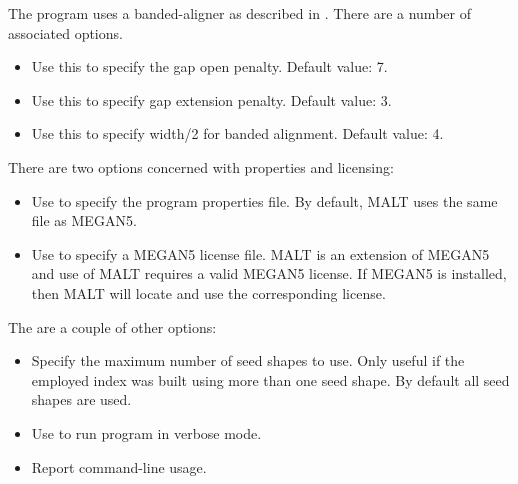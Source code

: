 \documentclass[11pt]{article}
\newcommand\MALT{{\sf MALT}\xspace}
\begin{document}
The program uses a banded-aligner as described in \cite{ChaoPM92}. There are a number of associated options.
\begin{itemize}
\setlength{\itemindent}{30pt}
\item[\itt{--gapOpen}]             Use this to specify the gap open penalty. Default value: 7.
\item[\itt{--gapExtend}]            Use this to specify  gap extension penalty. Default value: 3.
\item[\itt{--band}]                 Use this to specify width/2 for banded alignment. Default value: 4.
\end{itemize}

There are two options concerned with properties and licensing:
\begin{itemize}
\setlength{\itemindent}{30pt}
\item[\itt{--propertiesFile}] Use to specify the program properties file. By default, \MALT uses the same file as MEGAN5.
\item[\itt{licenseFile}] Use to specify a MEGAN5 license file. \MALT is an extension of MEGAN5 and use of \MALT requires a valid MEGAN5 license.
If MEGAN5 is installed, then \MALT will locate and use the corresponding license.
\end{itemize}

The are a couple of other options:
\begin{itemize}
\setlength{\itemindent}{30pt}
\item[\itt{--maxShapes}] Specify the maximum number of seed shapes to use. Only useful if the employed index was built using
more than one seed shape. By default all seed shapes are used.
\item[\itt{--verbose}] Use to run program in verbose mode.
\item[\itt{--help}] Report command-line usage.
\end{itemize}
\end{document}
